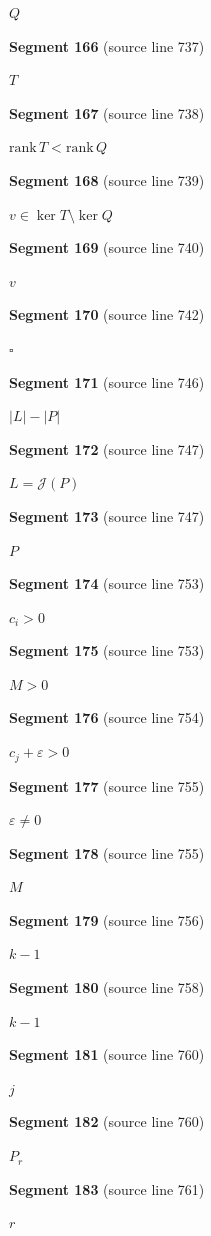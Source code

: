 \documentclass[11pt]{article}
\begin{document}
\( Q \)\par
\textbf{Segment 166} (source line 737)\par
\( T \)\par
\textbf{Segment 167} (source line 738)\par
\( \mathrm{rank}\,T<\mathrm{rank}\,Q \)\par
\textbf{Segment 168} (source line 739)\par
\( v\in\ker T\setminus\ker Q \)\par
\textbf{Segment 169} (source line 740)\par
\( v \)\par
\textbf{Segment 170} (source line 742)\par
\( \square \)\par
\textbf{Segment 171} (source line 746)\par
\( |L|-|P| \)\par
\textbf{Segment 172} (source line 747)\par
\( L=\mathcal J(P) \)\par
\textbf{Segment 173} (source line 747)\par
\( P \)\par
\textbf{Segment 174} (source line 753)\par
\( c_i>0 \)\par
\textbf{Segment 175} (source line 753)\par
\( M>0 \)\par
\textbf{Segment 176} (source line 754)\par
\( c_j+\varepsilon>0 \)\par
\textbf{Segment 177} (source line 755)\par
\( \varepsilon\ne0 \)\par
\textbf{Segment 178} (source line 755)\par
\( M \)\par
\textbf{Segment 179} (source line 756)\par
\( k-1 \)\par
\textbf{Segment 180} (source line 758)\par
\( k-1 \)\par
\textbf{Segment 181} (source line 760)\par
\( j \)\par
\textbf{Segment 182} (source line 760)\par
\( P_r \)\par
\textbf{Segment 183} (source line 761)\par
\( r \)\par
\end{document}
